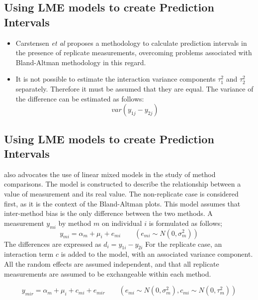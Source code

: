 \documentclass{report}
\begin{document}
\subsection*{Using LME models to create Prediction Intervals}


%

%
\Large
\begin{itemize}
	\item Carstensen \textit{et al} \cite{BXC2008} proposes a methodology to calculate prediction
	intervals in the presence of replicate measurements, overcoming
	problems associated with Bland-Altman methodology in this regard.
	\item It is not possible to estimate the interaction variance components
	$\tau^{2}_{1}$ and $\tau^{2}_{2}$ separately. Therefore it must be
	assumed that they are equal. The variance of the difference can be
	estimated as follows:
	\begin{equation}
		var(y_{1j}-y_{2j})
	\end{equation}
\end{itemize}
\subsection{Using LME models to create Prediction Intervals}
\citet{BXC2004} also advocates the use of linear mixed models in
the study of method comparisons. The model is constructed to
describe the relationship between a value of measurement and its
real value. The non-replicate case is considered first, as it is
the context of the Bland-Altman plots. This model assumes that
inter-method bias is the only difference between the two methods.
A measurement $y_{mi}$ by method $m$ on individual $i$ is
formulated as follows;
\begin{equation}
	y_{mi}  = \alpha_{m} + \mu_{i} + e_{mi} \qquad ( e_{mi} \sim
	N(0,\sigma^{2}_{m}))
\end{equation}
The differences are expressed as $d_{i} = y_{1i} - y_{2i}$ For the
replicate case, an interaction term $c$ is added to the model,
with an associated variance component. All the random effects are
assumed independent, and that all replicate measurements are
assumed to be exchangeable within each method.

\begin{equation}
	y_{mir}  = \alpha_{m} + \mu_{i} + c_{mi} + e_{mir} \qquad ( e_{mi}
	\sim N(0,\sigma^{2}_{m}), c_{mi} \sim N(0,\tau^{2}_{m}))
\end{equation}
\end{document}
